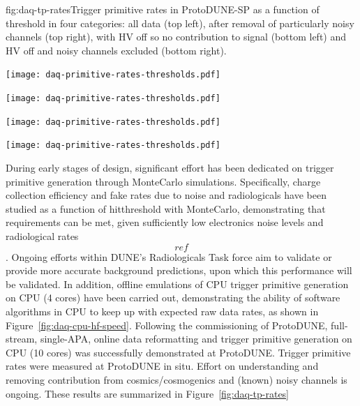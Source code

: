 \begin{dunefigure}{fig:daq-tp-rates}{Trigger primitive rates in ProtoDUNE-SP as a function of threshold in four categories: all data (top left),  after removal of particularly noisy channels (top right), with HV off so no contribution to signal (bottom left) and HV off and noisy channels excluded (bottom right).}
  \begin{minipage}[b]{0.5\linewidth}
    \begin{center}
      \texttt{[image: daq-primitive-rates-thresholds.pdf]}

      \texttt{[image: daq-primitive-rates-thresholds.pdf]}
    \end{center}
  \end{minipage}%
  \begin{minipage}[b]{0.5\linewidth}
    \begin{center}
      \texttt{[image: daq-primitive-rates-thresholds.pdf]}

      \texttt{[image: daq-primitive-rates-thresholds.pdf]}
    \end{center}
  \end{minipage}

\end{dunefigure}


During early stages of design, significant effort has been dedicated on trigger primitive generation
through MonteCarlo simulations. Specifically, charge collection efficiency and fake rates
due to noise and radiologicals have been studied as a function of
hitthreshold with MonteCarlo, demonstrating that requirements can be
met, given sufficiently low electronics noise levels and radiological
rates \[ref\]. Ongoing efforts within DUNE's Radiologicals Task force
aim to validate or provide more accurate background predictions, upon
which this performance will be validated. In addition, offline emulations
of CPU trigger primitive generation on CPU (4 cores) have been carried
out, demonstrating the ability of software algorithms in CPU to keep
up with expected raw data rates, as shown in Figure~\ref{fig:daq-cpu-hf-speed}. 
Following the commissioning of ProtoDUNE, full-stream, single-APA,
online data reformatting and trigger primitive generation on CPU (10 cores) was successfully
demonstrated at ProtoDUNE. Trigger primitive rates were measured at
ProtoDUNE in situ. Effort on understanding and removing contribution
from cosmics/cosmogenics and (known) noisy channels is ongoing.
These results are summarized in Figure~\ref{fig:daq-tp-rates}

